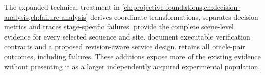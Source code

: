 \ifFullReport
The expanded technical treatment in \cref{ch:projective-foundations,ch:decision-analysis,ch:failure-analysis} derives coordinate transformations, separates decision metrics and traces stage-specific failures.  provide the complete scene-level evidence for every selected sequence and site.  document executable verification contracts and a proposed revision-aware service design.  retains all oracle-pair outcomes, including failures. These additions expose more of the existing evidence without presenting it as a larger independently acquired experimental population.
\fi
